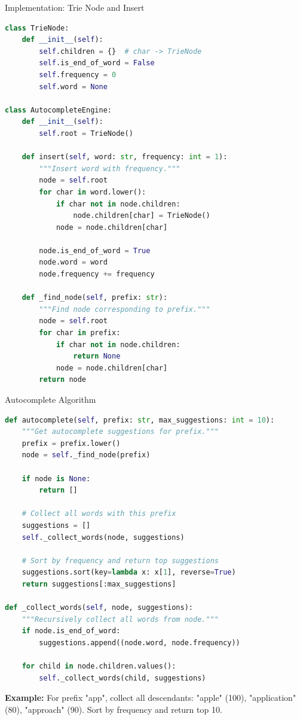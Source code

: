 \documentclass[aspectratio=169,xcolor=dvipsnames]{beamer}
\begin{document}
\begin{frame}[fragile]{Implementation: Trie Node and Insert}
\begin{lstlisting}[language=Python, basicstyle=\tiny\ttfamily]
class TrieNode:
    def __init__(self):
        self.children = {}  # char -> TrieNode
        self.is_end_of_word = False
        self.frequency = 0
        self.word = None

class AutocompleteEngine:
    def __init__(self):
        self.root = TrieNode()

    def insert(self, word: str, frequency: int = 1):
        """Insert word with frequency."""
        node = self.root
        for char in word.lower():
            if char not in node.children:
                node.children[char] = TrieNode()
            node = node.children[char]

        node.is_end_of_word = True
        node.word = word
        node.frequency += frequency

    def _find_node(self, prefix: str):
        """Find node corresponding to prefix."""
        node = self.root
        for char in prefix:
            if char not in node.children:
                return None
            node = node.children[char]
        return node
\end{lstlisting}
\end{frame}

\begin{frame}[fragile]{Autocomplete Algorithm}
\begin{lstlisting}[language=Python, basicstyle=\tiny\ttfamily]
def autocomplete(self, prefix: str, max_suggestions: int = 10):
    """Get autocomplete suggestions for prefix."""
    prefix = prefix.lower()
    node = self._find_node(prefix)

    if node is None:
        return []

    # Collect all words with this prefix
    suggestions = []
    self._collect_words(node, suggestions)

    # Sort by frequency and return top suggestions
    suggestions.sort(key=lambda x: x[1], reverse=True)
    return suggestions[:max_suggestions]

def _collect_words(self, node, suggestions):
    """Recursively collect all words from node."""
    if node.is_end_of_word:
        suggestions.append((node.word, node.frequency))

    for child in node.children.values():
        self._collect_words(child, suggestions)
\end{lstlisting}

\vspace{0.2cm}
\textbf{Example:} For prefix "app", collect all descendants: "apple" (100), "application" (80), "approach" (90). Sort by frequency and return top 10.
\end{frame}
\end{document}
